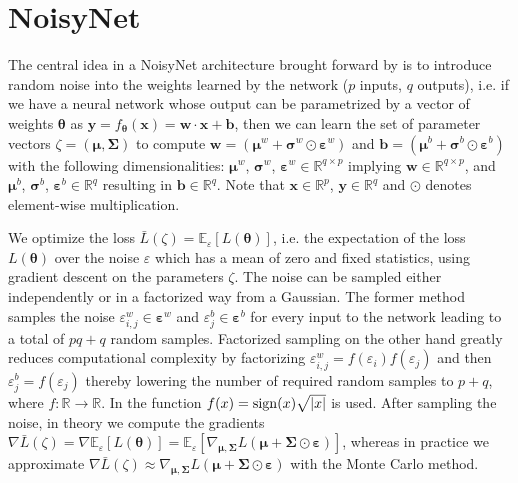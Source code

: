 \hypertarget{algo-noisynet}{\section{NoisyNet}}

\noindent The central idea in a NoisyNet architecture brought forward by \cite{noisynet-paper} is to introduce random noise into the weights learned by the network ($p$ inputs, $q$ outputs), i.e. if we have a neural network whose output can be parametrized by a vector of weights $\boldsymbol{\theta}$ as $\textbf{y} = f_{\boldsymbol{\theta}}(\textbf{x}) = \textbf{w} \cdot \textbf{x} + \textbf{b}$, then we can learn the set of parameter vectors $\zeta = (\boldsymbol{\mu}, \boldsymbol{\Sigma})$ to compute $\textbf{w} = (\boldsymbol{\mu}^{w} + \boldsymbol{\sigma}^{w} \odot \boldsymbol{\varepsilon}^{w})$ and $\textbf{b} = (\boldsymbol{\mu}^{b} + \boldsymbol{\sigma}^{b} \odot \boldsymbol{\varepsilon}^{b})$ with the following dimensionalities: $\boldsymbol{\mu}^{w}$, $\boldsymbol{\sigma}^{w}$, $\boldsymbol{\varepsilon}^{w} \in \mathbb{R}^{q \times p}$ implying $\textbf{w} \in \mathbb{R}^{q \times p}$, and $\boldsymbol{\mu}^{b}$, $\boldsymbol{\sigma}^{b}$, $\boldsymbol{\varepsilon}^{b} \in \mathbb{R}^{q}$ resulting in $\textbf{b} \in \mathbb{R}^{q}$. Note that $\textbf{x} \in \mathbb{R}^{p}$, $\textbf{y} \in \mathbb{R}^{q}$ and $\odot$ denotes element-wise multiplication.

\noindent We optimize the loss $\bar{L}(\zeta) = \mathbb{E}_{\varepsilon}[L(\boldsymbol{\theta})]$, i.e. the expectation of the loss $L(\boldsymbol{\theta})$ over the noise $\varepsilon$ which has a mean of zero and fixed statistics, using gradient descent on the parameters $\zeta$. The noise can be sampled either independently or in a factorized way from a Gaussian. The former method samples the noise $\varepsilon^{w}_{i,j} \in \boldsymbol{\varepsilon}^{w}$ and $\varepsilon^{b}_{j} \in \boldsymbol{\varepsilon}^{b}$ for every input to the network leading to a total of $pq + q$ random samples. Factorized sampling on the other hand greatly reduces computational complexity by factorizing $\varepsilon^{w}_{i,j} = f(\varepsilon_{i}) f(\varepsilon_{j})$ and then $\varepsilon^{b}_{j} = f(\varepsilon_{j})$ thereby lowering the number of required random samples to $p + q$, where $f: \mathbb{R} \rightarrow \mathbb{R}$. In \cite{noisynet-paper} the function $f(x) = \operatorname{sign}(x) \sqrt{|x|}$ is used. After sampling the noise, in theory we compute the gradients $\nabla\bar{L}(\zeta) = \nabla\mathbb{E}_{\varepsilon}[L(\boldsymbol{\theta})] = \mathbb{E}_{\varepsilon}[\nabla_{\boldsymbol{\mu}, \boldsymbol{\Sigma}}L(\boldsymbol{\mu} + \boldsymbol{\Sigma} \odot \boldsymbol{\varepsilon})]$, whereas in practice we approximate $\nabla\bar{L}(\zeta) \approx \nabla_{\boldsymbol{\mu}, \boldsymbol{\Sigma}}L(\boldsymbol{\mu} + \boldsymbol{\Sigma} \odot \boldsymbol{\varepsilon})$ with the Monte Carlo method.

